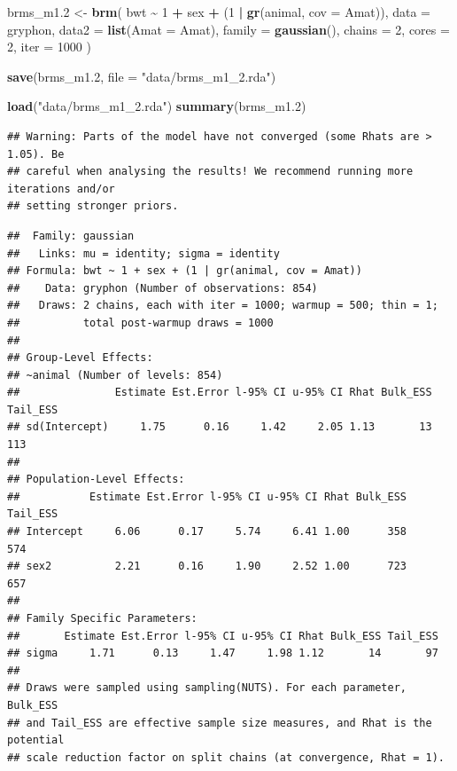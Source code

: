 \documentclass[
  12pt,
]{book}
\newenvironment{Shaded}{\begin{snugshade}}{\end{snugshade}}
\newcommand{\DataTypeTok}[1]{\textcolor[rgb]{0.13,0.29,0.53}{#1}}
\newcommand{\DecValTok}[1]{\textcolor[rgb]{0.00,0.00,0.81}{#1}}
\newcommand{\FloatTok}[1]{\textcolor[rgb]{0.00,0.00,0.81}{#1}}
\newcommand{\KeywordTok}[1]{\textcolor[rgb]{0.13,0.29,0.53}{\textbf{#1}}}
\newcommand{\NormalTok}[1]{#1}
\newcommand{\OperatorTok}[1]{\textcolor[rgb]{0.81,0.36,0.00}{\textbf{#1}}}
\newcommand{\StringTok}[1]{\textcolor[rgb]{0.31,0.60,0.02}{#1}}
\begin{document}
\begin{Shaded}
\begin{Highlighting}[]
\NormalTok{brms\_m1}\FloatTok{.2}\NormalTok{ \textless{}{-}}\StringTok{ }\KeywordTok{brm}\NormalTok{(}
\NormalTok{  bwt }\OperatorTok{\textasciitilde{}}\StringTok{ }\DecValTok{1} \OperatorTok{+}\StringTok{ }\NormalTok{sex }\OperatorTok{+}\StringTok{ }\NormalTok{(}\DecValTok{1} \OperatorTok{|}\StringTok{ }\KeywordTok{gr}\NormalTok{(animal, }\DataTypeTok{cov =}\NormalTok{ Amat)),}
  \DataTypeTok{data =}\NormalTok{ gryphon,}
  \DataTypeTok{data2 =} \KeywordTok{list}\NormalTok{(}\DataTypeTok{Amat =}\NormalTok{ Amat),}
  \DataTypeTok{family =} \KeywordTok{gaussian}\NormalTok{(),}
  \DataTypeTok{chains =} \DecValTok{2}\NormalTok{, }\DataTypeTok{cores =} \DecValTok{2}\NormalTok{, }\DataTypeTok{iter =} \DecValTok{1000}
\NormalTok{)}

\KeywordTok{save}\NormalTok{(brms\_m1}\FloatTok{.2}\NormalTok{, }\DataTypeTok{file =} \StringTok{"data/brms\_m1\_2.rda"}\NormalTok{)}
\end{Highlighting}
\end{Shaded}

\begin{Shaded}
\begin{Highlighting}[]
\KeywordTok{load}\NormalTok{(}\StringTok{"data/brms\_m1\_2.rda"}\NormalTok{)}
\KeywordTok{summary}\NormalTok{(brms\_m1}\FloatTok{.2}\NormalTok{)}
\end{Highlighting}
\end{Shaded}

\begin{verbatim}
## Warning: Parts of the model have not converged (some Rhats are > 1.05). Be
## careful when analysing the results! We recommend running more iterations and/or
## setting stronger priors.
\end{verbatim}

\begin{verbatim}
##  Family: gaussian 
##   Links: mu = identity; sigma = identity 
## Formula: bwt ~ 1 + sex + (1 | gr(animal, cov = Amat)) 
##    Data: gryphon (Number of observations: 854) 
##   Draws: 2 chains, each with iter = 1000; warmup = 500; thin = 1;
##          total post-warmup draws = 1000
## 
## Group-Level Effects: 
## ~animal (Number of levels: 854) 
##               Estimate Est.Error l-95% CI u-95% CI Rhat Bulk_ESS Tail_ESS
## sd(Intercept)     1.75      0.16     1.42     2.05 1.13       13      113
## 
## Population-Level Effects: 
##           Estimate Est.Error l-95% CI u-95% CI Rhat Bulk_ESS Tail_ESS
## Intercept     6.06      0.17     5.74     6.41 1.00      358      574
## sex2          2.21      0.16     1.90     2.52 1.00      723      657
## 
## Family Specific Parameters: 
##       Estimate Est.Error l-95% CI u-95% CI Rhat Bulk_ESS Tail_ESS
## sigma     1.71      0.13     1.47     1.98 1.12       14       97
## 
## Draws were sampled using sampling(NUTS). For each parameter, Bulk_ESS
## and Tail_ESS are effective sample size measures, and Rhat is the potential
## scale reduction factor on split chains (at convergence, Rhat = 1).
\end{verbatim}
\end{document}
